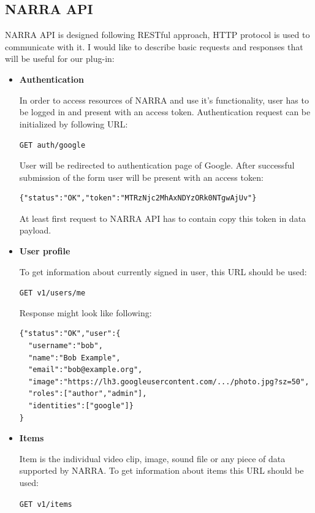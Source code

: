 \documentclass[thesis=B,english]{FITthesis}[2012/10/20]
\begin{document}
\subsection{NARRA API}
NARRA API is designed following RESTful approach, HTTP protocol is used to communicate with it. I would like to describe basic requests and responses that will be useful for our plug-in:
	\begin{itemize}
		\item \textbf{Authentication} \cite{api_auth}

In order to access resources of NARRA and use it's functionality, user has to be logged in and present with an access token. Authentication request can be  initialized by following URL: 

\texttt{GET auth/google}

User will be redirected to authentication page of Google. After successful submission of the form user will be present with an access token:
\begin{verbatim}
{"status":"OK","token":"MTRzNjc2MhAxNDYzORk0NTgwAjUv"}
\end{verbatim}
At least first request to NARRA API has to contain copy this token in data payload.

		\item \textbf{User profile} \cite{api_profile}

To get information about currently signed in user, this URL should be used:

\texttt{GET v1/users/me}

Response might look like following:

\begin{verbatim}
{"status":"OK","user":{
  "username":"bob",
  "name":"Bob Example",
  "email":"bob@example.org",
  "image":"https://lh3.googleusercontent.com/.../photo.jpg?sz=50",
  "roles":["author","admin"],
  "identities":["google"]}
}
\end{verbatim}

		\item \textbf{Items} \cite{api_items}

Item is the individual video clip, image, sound file or any piece of data supported by NARRA. To get information about items this URL should be used:

\texttt{GET v1/items}


\end{itemize}
\end{document}
